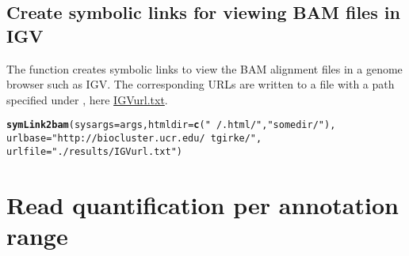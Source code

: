 \documentclass{article}\usepackage[]{graphicx}\usepackage[]{color}
\makeatletter
\newcommand{\hlstr}[1]{\textcolor[rgb]{0.192,0.494,0.8}{#1}}%
\newcommand{\hlstd}[1]{\textcolor[rgb]{0.345,0.345,0.345}{#1}}%
\newcommand{\hlkwc}[1]{\textcolor[rgb]{0.333,0.667,0.333}{#1}}%
\newcommand{\hlkwd}[1]{\textcolor[rgb]{0.737,0.353,0.396}{\textbf{#1}}}%
\newenvironment{kframe}{%
 \def\at@end@of@kframe{}%
 \ifinner\ifhmode%
  \def\at@end@of@kframe{\end{minipage}}%
  \begin{minipage}{\columnwidth}%
 \fi\fi%
 \def\FrameCommand##1{\hskip\@totalleftmargin \hskip-\fboxsep
 \colorbox{shadecolor}{##1}\hskip-\fboxsep
     \hskip-\linewidth \hskip-\@totalleftmargin \hskip\columnwidth}%
 \MakeFramed {\advance\hsize-\width
   \@totalleftmargin\z@ \linewidth\hsize
   \@setminipage}}%
 {\par\unskip\endMakeFramed%
 \at@end@of@kframe}
\newenvironment{knitrout}{}{} %
\makeatother
\begin{document}
\subsection{Create symbolic links for viewing BAM files in IGV}
The  function creates symbolic links to view the BAM alignment files in a genome browser such as IGV. The corresponding URLs are written to a file with a path specified under , here \href{run:./results/IGVurl.txt}{IGVurl.txt}.
\begin{knitrout}
\color{fgcolor}\begin{kframe}
\begin{alltt}
\hlkwd{symLink2bam}\hlstd{(}\hlkwc{sysargs}\hlstd{=args,} \hlkwc{htmldir}\hlstd{=}\hlkwd{c}\hlstd{(}\hlstr{"~/.html/"}\hlstd{,} \hlstr{"somedir/"}\hlstd{),}
            \hlkwc{urlbase}\hlstd{=}\hlstr{"http://biocluster.ucr.edu/~tgirke/"}\hlstd{,}
            \hlkwc{urlfile}\hlstd{=}\hlstr{"./results/IGVurl.txt"}\hlstd{)}
\end{alltt}
\end{kframe}
\end{knitrout}

\section{Read quantification per annotation range}
\end{document}
